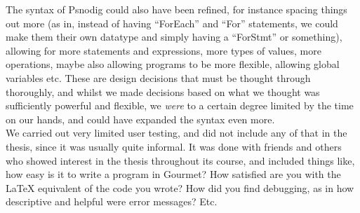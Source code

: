 \documentclass[twoside, openright, a4paper,  UKenglish]{report}
\begin{document}
The syntax of Psnodig could also have been refined, for instance spacing things out more (as in, instead of having ``ForEach'' and ``For'' statements, we could make them their own datatype and simply having a ``ForStmt'' or something), allowing for more statements and expressions, more types of values, more operations, maybe also allowing programs to be more flexible, allowing global variables etc. These are design decisions that must be thought through thoroughly, and whilst we made decisions based on what we thought was sufficiently powerful and flexible, we \textit{were} to a certain degree limited by the time on our hands, and could have expanded the syntax even more. \hfill \\

We carried out very limited user testing, and did not include any of that in the thesis, since it was usually quite informal. It was done with friends and others who showed interest in the thesis throughout its course, and included things like, how easy is it to write a program in Gourmet? How satisfied are you with the LaTeX equivalent of the code you wrote? How did you find debugging, as in how descriptive and helpful were error messages? Etc.

\printbibliography
\end{document}
